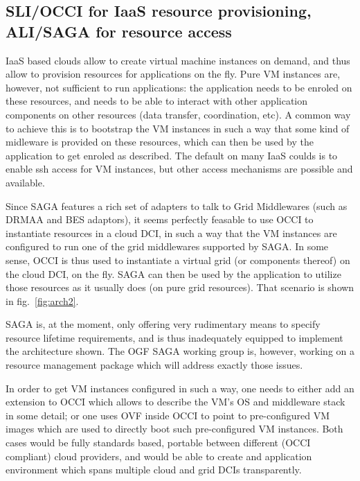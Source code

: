 \documentclass[10pt,conference,final,letterpaper,twoside,twocolumn,]{IEEEtran}
\begin{document}
 \subsection{SLI/OCCI for IaaS resource provisioning, ALI/SAGA for
 resource access} 

 IaaS based clouds allow to create virtual machine instances on
 demand, and thus allow to provision resources for applications on the
 fly.  Pure VM instances are, however, not sufficient to run
 applications: the application needs to be enroled on these resources,
 and needs to be able to interact with other application components on
 other resources (data transfer, coordination, etc).  A common way to
 achieve this is to bootstrap the VM instances in such a way that some
 kind of midleware is provided on these resources, which can then be
 used by the application to get enroled as described.  The default on
 many IaaS coulds is to enable ssh access for VM instances, but other
 access mechanisms are possible and available.

 Since SAGA features a rich set of adapters to talk to Grid
 Middlewares (such as DRMAA and BES adaptors), it seems perfectly
 feasable to use OCCI to instantiate resources in a cloud DCI, in such
 a way that the VM instances are configured to run one of the grid
 middlewares supported by SAGA.  In some sense, OCCI is thus used to
 instantiate a virtual grid (or components thereof) on the cloud DCI,
 on the fly.  SAGA can then be used by the application to utilize
 those resources as it usually does (on pure grid resources).  That
 scenario is shown in fig.~\ref{fig:arch2}.

 SAGA is, at the moment, only offering very rudimentary means to
 specify resource lifetime requirements, and is thus inadequately
 equipped to implement the architecture shown.  The OGF SAGA working
 group is, however, working on a resource management package which
 will address exactly those issues.

 In order to get VM instances configured in  such a way, one needs to
 either add an extension to OCCI which allows to describe the VM's OS
 and middleware stack in some detail; or one uses OVF inside OCCI to
 point to pre-configured VM images which are used to directly boot
 such pre-configured VM instances.  Both cases would be fully
 standards based, portable between different (OCCI compliant) cloud
 providers, and would be able to create and application environment
 which spans multiple cloud and grid DCIs transparently.
\end{document}

